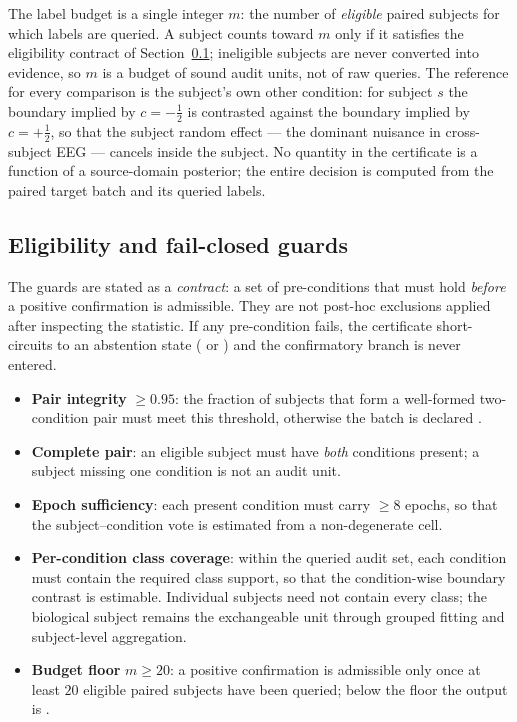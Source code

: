 The label budget is a single integer $m$: the number of \emph{eligible} paired subjects for which labels are
queried. A subject counts toward $m$ only if it satisfies the eligibility contract of
Section~\ref{sec:b3-guards}; ineligible subjects are never converted into evidence, so $m$ is a budget of
sound audit units, not of raw queries. The reference for every comparison is the subject's own other
condition: for subject $s$ the boundary implied by $c=-\tfrac12$ is contrasted against the boundary implied
by $c=+\tfrac12$, so that the subject random effect --- the dominant nuisance in cross-subject EEG --- cancels
inside the subject. No quantity in the certificate is a function of a source-domain posterior; the entire
decision is computed from the paired target batch and its queried labels.

\subsection{Eligibility and fail-closed guards}
\label{sec:b3-guards}
The guards are stated as a \emph{contract}: a set of pre-conditions that must hold \emph{before} a positive
confirmation is admissible. They are not post-hoc exclusions applied after inspecting the statistic. If any
pre-condition fails, the certificate short-circuits to an abstention state
(\stneed{} or \stinv{}) and the confirmatory branch is never entered.

\begin{itemize}
  \item \textbf{Pair integrity} $\geq 0.95$: the fraction of subjects that form a well-formed two-condition
        pair must meet this threshold, otherwise the batch is declared \stinv{}.
  \item \textbf{Complete pair}: an eligible subject must have \emph{both} conditions present; a subject
        missing one condition is not an audit unit.
  \item \textbf{Epoch sufficiency}: each present condition must carry $\geq 8$ epochs, so that the
        subject--condition vote is estimated from a non-degenerate cell.
  \item \textbf{Per-condition class coverage}: within the queried audit set, each condition must contain the
        required class support, so that the condition-wise boundary contrast is estimable. Individual
        subjects need not contain every class; the biological subject remains the exchangeable unit through
        grouped fitting and subject-level aggregation.
  \item \textbf{Budget floor} $m\geq 20$: a positive confirmation is admissible only once at least $20$
        eligible paired subjects have been queried; below the floor the output is \stneed{}.
\end{itemize}

